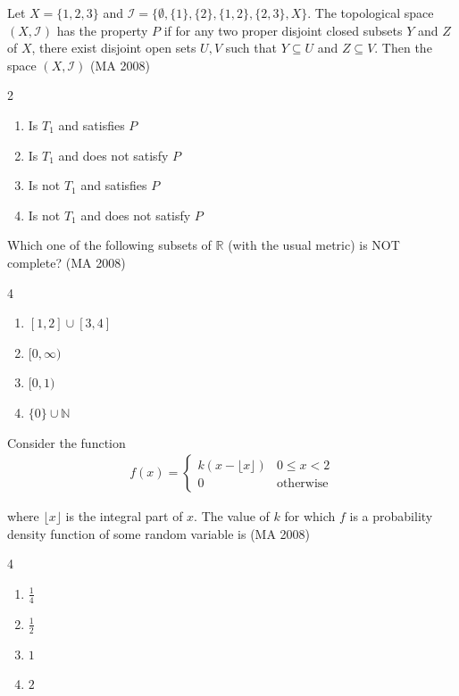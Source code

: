 \item
Let $X = \{1,2,3\}$ and $\mathcal{I} = \{\emptyset, \{1\}, \{2\}, \{1,2\}, \{2,3\}, X\}$. The topological space $(X, \mathcal{I})$ has the property $P$ if for any two proper disjoint closed subsets $Y$ and $Z$ of $X$, there exist disjoint open sets $U, V$ such that $Y \subseteq U$ and $Z \subseteq V$. Then the space $(X, \mathcal{I})$
\hfill (MA 2008)
\begin{multicols}{2}
\begin{enumerate}
    \item Is $T_1$ and satisfies $P$
    \item Is $T_1$ and does not satisfy $P$
    \item Is not $T_1$ and satisfies $P$
    \item Is not $T_1$ and does not satisfy $P$
\end{enumerate}
\end{multicols}

\item
Which one of the following subsets of $\mathbb{R}$ (with the usual metric) is NOT complete?
\hfill (MA 2008)
\begin{multicols}{4}
\begin{enumerate}
    \item $[1,2] \cup [3,4]$
    \item $[0, \infty)$
    \item $[0,1)$
    \item $\{0\} \cup \mathbb{N}$
\end{enumerate}
\end{multicols}

\item
Consider the function
\begin{align}
    f(x) = 
\begin{cases}
k(x - \lfloor x \rfloor) & 0 \leq x < 2 \\
0 & \text{otherwise}
\end{cases}
\end{align}

where $\lfloor x \rfloor$ is the integral part of $x$. The value of $k$ for which $f$ is a probability density function of some random variable is
\hfill (MA 2008)
\begin{multicols}{4}
\begin{enumerate}
    \item $\frac{1}{4}$
    \item $\frac{1}{2}$
    \item $1$
    \item $2$
\end{enumerate}
\end{multicols}

